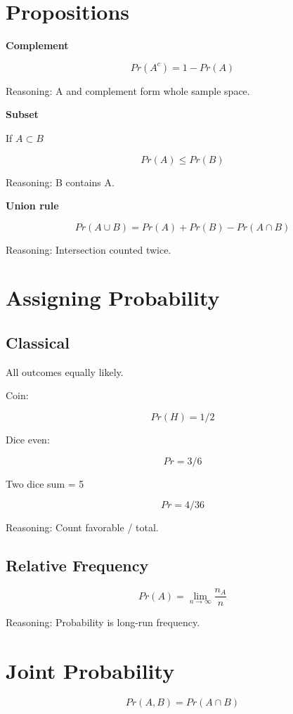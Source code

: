 \documentclass[12pt]{article}
\begin{document}
\section{Propositions}

\textbf{Complement}

\[
Pr(A^c) = 1 - Pr(A)
\]

Reasoning: A and complement form whole sample space.

\bigskip

\textbf{Subset}

If $A \subset B$

\[
Pr(A) \le Pr(B)
\]

Reasoning: B contains A.

\bigskip

\textbf{Union rule}

\[
Pr(A \cup B)
=
Pr(A) + Pr(B) - Pr(A \cap B)
\]

Reasoning: Intersection counted twice.

\section{Assigning Probability}

\subsection{Classical}

All outcomes equally likely.

Coin:

\[
Pr(H)=1/2
\]

Dice even:

\[
Pr = 3/6
\]

Two dice sum = 5

\[
Pr = 4/36
\]

Reasoning: Count favorable / total.

\subsection{Relative Frequency}

\[
Pr(A) =
\lim_{n \to \infty}
\frac{n_A}{n}
\]

Reasoning: Probability is long-run frequency.

\section{Joint Probability}

\[
Pr(A,B) = Pr(A \cap B)
\]
\end{document}
